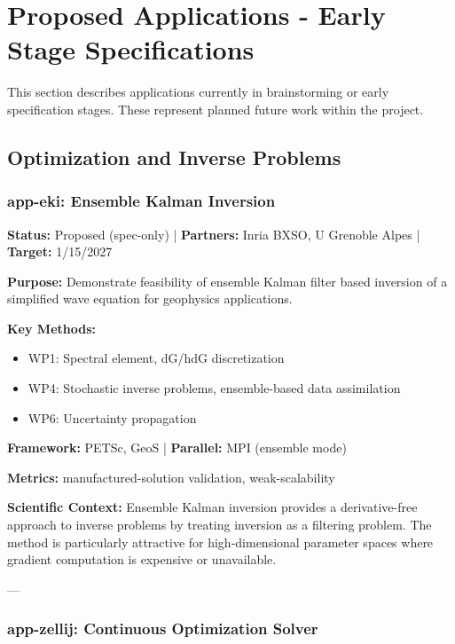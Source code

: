 
\section{Proposed Applications - Early Stage Specifications}
\label{sec:app:specs:proposed}

This section describes applications currently in brainstorming or early specification stages. These represent planned future work within the \exama project.

\subsection{Optimization and Inverse Problems}

\subsubsection{app-eki: Ensemble Kalman Inversion}
\label{sec:app:specs:app-eki}

\textbf{Status:} Proposed (spec-only) | \textbf{Partners:} Inria BXSO, U Grenoble Alpes | \textbf{Target:} 1/15/2027

\textbf{Purpose:} Demonstrate feasibility of ensemble Kalman filter based inversion of a simplified wave equation for geophysics applications.

\textbf{Key Methods:}
\begin{itemize}
\item WP1: Spectral element, dG/hdG discretization
\item WP4: Stochastic inverse problems, ensemble-based data assimilation
\item WP6: Uncertainty propagation
\end{itemize}

\textbf{Framework:} PETSc, GeoS | \textbf{Parallel:} MPI (ensemble mode)

\textbf{Metrics:} manufactured-solution validation, weak-scalability

\textbf{Scientific Context:} Ensemble Kalman inversion provides a derivative-free approach to inverse problems by treating inversion as a filtering problem. The method is particularly attractive for high-dimensional parameter spaces where gradient computation is expensive or unavailable.

---

\subsubsection{app-zellij: Continuous Optimization Solver}
\label{sec:app:specs:app-zellij}

